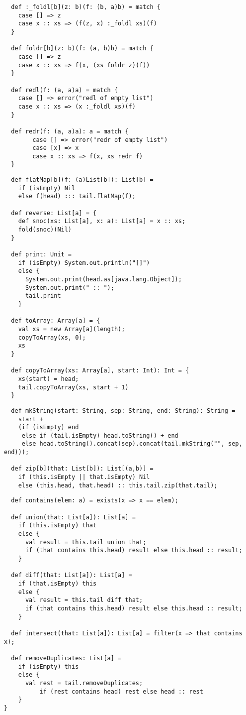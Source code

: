 \documentclass[a4paper,12pt,twoside,titlepage]{book}
\begin{document}
\begin{lstlisting}
  def :_foldl[b](z: b)(f: (b, a)b) = match {
    case [] => z
    case x :: xs => (f(z, x) :_foldl xs)(f)
  }

  def foldr[b](z: b)(f: (a, b)b) = match {
    case [] => z
    case x :: xs => f(x, (xs foldr z)(f))
  }

  def redl(f: (a, a)a) = match {
    case [] => error("redl of empty list")
    case x :: xs => (x :_foldl xs)(f)
  }

  def redr(f: (a, a)a): a = match {
        case [] => error("redr of empty list")
        case [x] => x
        case x :: xs => f(x, xs redr f)
  }
\end{lstlisting}
\begin{lstlisting}
  def flatMap[b](f: (a)List[b]): List[b] =
    if (isEmpty) Nil
    else f(head) ::: tail.flatMap(f);

  def reverse: List[a] = {
    def snoc(xs: List[a], x: a): List[a] = x :: xs;
    fold(snoc)(Nil)
  }

  def print: Unit =
    if (isEmpty) System.out.println("[]")
    else {
      System.out.print(head.as[java.lang.Object]);
      System.out.print(" :: ");
      tail.print
    }

  def toArray: Array[a] = {
    val xs = new Array[a](length);
    copyToArray(xs, 0);
    xs
  }

  def copyToArray(xs: Array[a], start: Int): Int = {
    xs(start) = head;
    tail.copyToArray(xs, start + 1)
  }
\end{lstlisting}
\begin{lstlisting}
  def mkString(start: String, sep: String, end: String): String =
    start +
    (if (isEmpty) end
     else if (tail.isEmpty) head.toString() + end
     else head.toString().concat(sep).concat(tail.mkString("", sep, end)));

  def zip[b](that: List[b]): List[(a,b)] =
    if (this.isEmpty || that.isEmpty) Nil
    else (this.head, that.head) :: this.tail.zip(that.tail);
\end{lstlisting}
\begin{lstlisting}
  def contains(elem: a) = exists(x => x == elem);

  def union(that: List[a]): List[a] =
    if (this.isEmpty) that
    else {
      val result = this.tail union that;
      if (that contains this.head) result else this.head :: result;
    }

  def diff(that: List[a]): List[a] =
    if (that.isEmpty) this
    else {
      val result = this.tail diff that;
      if (that contains this.head) result else this.head :: result;
    }

  def intersect(that: List[a]): List[a] = filter(x => that contains x);

  def removeDuplicates: List[a] =
    if (isEmpty) this
    else {
      val rest = tail.removeDuplicates;
          if (rest contains head) rest else head :: rest
    }
}
\end{lstlisting}
\end{document}
